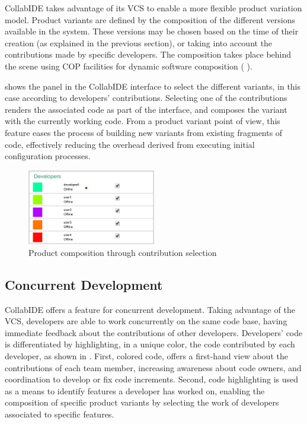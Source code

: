 CollabIDE takes advantage of its \ac{VCS} to enable a more flexible product variation model. Product 
variants are defined by the composition of the different versions available in the system. These 
versions may be chosen based on the time of their creation (as explained in the previous section), or 
taking into account the contributions made by specific developers. The composition takes place 
behind the scene using \ac{COP} facilities for dynamic software composition (\cf 
{}).

 shows the panel in the CollabIDE interface to select the different variants, in this 
case according to developers' contributions. Selecting one of the contributions renders the associated 
code as part of the interface, and composes the variant with the currently working code. From a 
product variant point of view, this feature eases the process of building new variants from existing 
fragments of code, effectively reducing the overhead derived from executing initial configuration 
processes.

\begin{figure}[htbp]
  \centering
  \includegraphics[width=0.5\textwidth]{img/fig3-collabIDEContributionManagement}
  \caption{Product composition through contribution selection}
  \label{fig:contribution}
\end{figure}


\subsection{Concurrent Development}

CollabIDE offers a feature for concurrent development. Taking advantage of the \ac{VCS}, developers 
are able to work concurrently on the same code base, having immediate feedback about the 
contributions of other developers.
Developers' code is differentiated by highlighting, in a unique color, the code contributed by each 
developer, as shown in . First, colored code, offers a first-hand view about the 
contributions of each team member, increasing awareness  about code owners, and coordination to 
develop or fix code increments. Second, code highlighting is used as a means to identify features a 
developer has worked on, enabling the composition of specific product variants by selecting the work 
of developers associated to specific features. 

